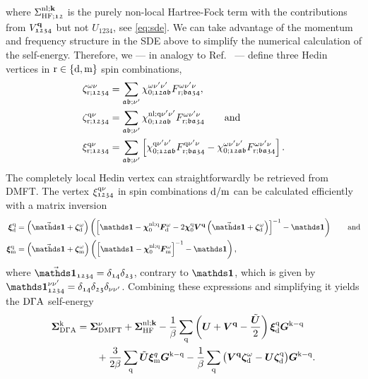 \documentclass[../../main.tex]{subfiles}
\begin{document}
where $\Sigma_{\text{HF};\mathfrak{12}}^{\text{nl};\textbf{k}}$ is the purely non-local Hartree-Fock term with the contributions from $V^{\textbf{q}}_{\mathfrak{1234}}$ but not $U_{\mathfrak{1234}}$, see \eqref{eq:sde}. We can take advantage of the momentum and frequency structure in the SDE above to simplify the numerical calculation of the self-energy. Therefore, we --- in analogy to Ref.~\cite{Galler2017} --- define three Hedin vertices in $\text{r}\in\{\text{d},\text{m}\}$ spin combinations,
\begin{align}\label{eq:three_leg_vertices_abinitio_dga}
	\zeta_{\text{r};\mathfrak{1234}}^{\omega\nu}&=\sum_{\mathfrak{ab;\nu'}}\chi_{0;\mathfrak{12ab}}^{\omega\nu'\nu'}F_{\text{r};\mathfrak{ba34}}^{\omega\nu'\nu},\\
	\zeta_{\text{r};\mathfrak{1234}}^{\text{q}\nu}&=\sum_{\mathfrak{ab;\nu'}}\chi_{0;\mathfrak{12ab}}^{\text{nl};\text{q}\nu'\nu'}F_{\text{r};\mathfrak{ba34}}^{\omega\nu'\nu}\qquad\text{and}\\
	\xi_{\text{r};\mathfrak{1234}}^{\text{q}\nu}&=\sum_{\mathfrak{ab;\nu'}}\left [\chi_{0;\mathfrak{12ab}}^{\text{q}\nu'\nu'}F_{\text{r};\mathfrak{ba34}}^{\text{q}\nu'\nu}-\chi_{0;\mathfrak{12ab}}^{\omega\nu'\nu'}F_{\text{r};\mathfrak{ba34}}^{\omega\nu'\nu}\right ].
\end{align}
The completely local Hedin vertex can straightforwardly be retrieved from DMFT. The vertex $\xi_{\mathfrak{1234}}^{\text{q}\nu}$ in spin combinations $\text{d}/\text{m}$ can be calculated efficiently with a matrix inversion
\begin{subequations}
\begin{align}
	\bm\xi_{\dens}^{\q}&=\left (\vec{\bm\unity}+\bm\zeta_{\dens}^{\omega}\right )\left (\left [\bm\unity-\bm\chi_{0}^{\nl;\q}\bm F_{\dens}^{\omega}-2\bm\chi_{0}^{\q}\bm V^{\vv{q}}\left (\vec{\bm\unity}+\bm\zeta_{\dens}^{\omega}\right )\right ]^{-1}-\bm\unity\right )\qqand\\
	\bm\xi_{\magn}^{\q}&=\left (\vec{\bm\unity}+\bm\zeta_{\magn}^{\omega}\right )\left (\left [\bm\unity-\bm\chi_{0}^{\nl;\q}\bm F_{\magn}^{\omega}\right ]^{-1}-\bm\unity\right ),
\end{align}
\end{subequations}
where $\vec{\bm\unity}_{\mathfrak{1234}}=\delta_{\mathfrak{14}}\delta_{\mathfrak{23}}$, contrary to $\bm\unity$, which is given by $\bm\unity_{\mathfrak{1234}}^{\nu\nu'}=\delta_{\mathfrak{14}}\delta_{\mathfrak{23}}\delta_{\nu\nu'}$. Combining these expressions and simplifying it \cite{Galler2017} yields the $\text{D}\Gamma\text{A}$ self-energy
\begin{align}\label{eq:sde_abinitio_dga}
\begin{split}
	\bm\Sigma_{\text{D}\Gamma\text{A}}^{\text{k}}&=\bm\Sigma_{\text{DMFT}}^{\nu}+\bm\Sigma_{\text{HF}}^{\text{nl};\textbf{k}}-\frac1\beta\sum_{\text{q}}\left (\bm U + \bm V^{\textbf{q}}-\frac{\tilde{\bm U}}{2}\right )\bm\xi_{\text{d}}^{\text{q}}\bm G^{\text{k}-\text{q}}\\
	&\qquad+\frac{3}{2\beta}\sum_{\text{q}}\tilde{\bm U}\bm\xi_{\text{m}}^{q}\bm G^{\text{k}-\text{q}}-\frac1\beta\sum_{\text{q}}\big (\bm V^{\textbf{q}}\bm\zeta_{\text{d}}^{\omega}-\bm U\bm\zeta_{\text{d}}^{\text{q}}\big )\bm G^{\text{k}-\text{q}}.
\end{split}
\end{align}
\end{document}
